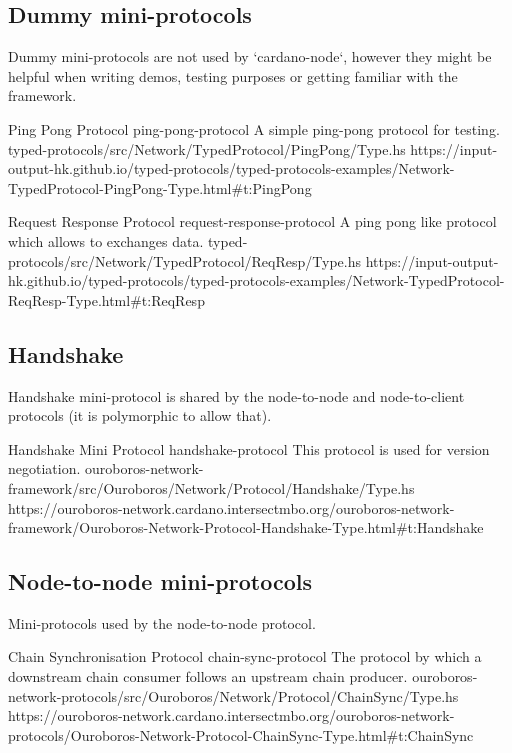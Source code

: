 \subsection{Dummy mini-protocols}

Dummy mini-protocols are not used by `cardano-node`, however they might be
helpful when writing demos, testing purposes or getting familiar with the
framework.

\miniEntry
    {Ping Pong Protocol}
    {ping-pong-protocol}
    {A simple ping-pong protocol for testing.}
    {typed-protocols/src/Network/TypedProtocol/PingPong/Type.hs}
    {https://input-output-hk.github.io/typed-protocols/typed-protocols-examples/Network-TypedProtocol-PingPong-Type.html\#t:PingPong}

\miniEntry
    {Request Response Protocol}
    {request-response-protocol}
    {A ping pong like protocol which allows to exchanges data.}
    {typed-protocols/src/Network/TypedProtocol/ReqResp/Type.hs}
    {https://input-output-hk.github.io/typed-protocols/typed-protocols-examples/Network-TypedProtocol-ReqResp-Type.html\#t:ReqResp}

\subsection{Handshake}

Handshake mini-protocol is shared by the node-to-node and node-to-client
protocols (it is polymorphic to allow that).

\miniEntry
    {Handshake Mini Protocol}
    {handshake-protocol}
    {This protocol is used for version negotiation.}
    {ouroboros-network-framework/src/Ouroboros/Network/Protocol/Handshake/Type.hs}
    {https://ouroboros-network.cardano.intersectmbo.org/ouroboros-network-framework/Ouroboros-Network-Protocol-Handshake-Type.html\#t:Handshake}

\subsection{Node-to-node mini-protocols}

Mini-protocols used by the node-to-node protocol.

\miniEntry
    {Chain Synchronisation Protocol}
    {chain-sync-protocol}
    {The protocol by which a downstream chain consumer follows an upstream chain producer.}
    {ouroboros-network-protocols/src/Ouroboros/Network/Protocol/ChainSync/Type.hs}
    {https://ouroboros-network.cardano.intersectmbo.org/ouroboros-network-protocols/Ouroboros-Network-Protocol-ChainSync-Type.html\#t:ChainSync}


